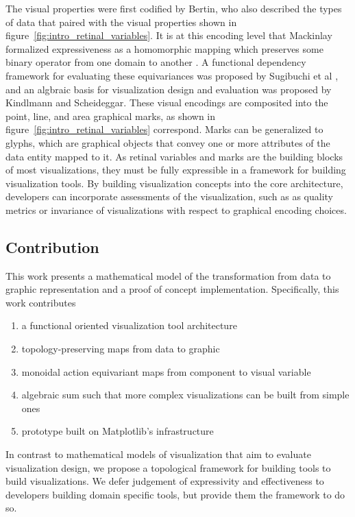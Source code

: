 \documentclass[../main.tex]{subfiles}
\begin{document}
The visual properties were first codified by Bertin\cite{bertinSemiologyGraphicsDiagrams2011a}, who also described the types of data that paired with the visual properties shown in figure~\ref{fig:intro_retinal_variables}. It is at this encoding level that Mackinlay formalized expressiveness as a homomorphic mapping which preserves some binary operator from one domain to another \cite{mackinlayAUTOMATICDESIGNGRAPHICAL1987}. A functional dependency framework for evaluating these equivariances was proposed by Sugibuchi et al \cite{sugibuchiFramwork2009}, and an algbraic basis for visualization design and evaluation was proposed by Kindlmann and Scheideggar\cite{kindlmann2014algebraic}. These visual encodings are composited into the point, line, and area graphical marks, as shown in figure~\ref{fig:intro_retinal_variables} correspond. Marks can be generalized to glyphs, which are graphical objects that convey one or more attributes of the data entity mapped to it\cite{ware2019information, munznerVisualizationAnalysisDesign2014}. As retinal variables and marks are the building blocks of most visualizations, they must be fully expressible in a framework for building visualization tools. By building visualization concepts into the core architecture, developers can incorporate assessments of the visualization,  such as as quality metrics\cite{bertiniQualityMetricsHighdimensional2011a} or invariance \cite{kindlmann2014algebraic} of visualizations with respect to graphical encoding choices.  

\subsection{Contribution}
This work presents a mathematical model of the transformation from data to graphic representation and a proof of concept implementation. Specifically, this work contributes

\begin{enumerate}
    \item a functional oriented visualization tool architecture
    \item topology-preserving maps from data to graphic 
    \item monoidal action equivariant maps from component to visual variable 
    \item algebraic sum such that more complex visualizations can be built from simple ones 
    \item prototype built on Matplotlib's infrastructure
\end{enumerate}
In contrast to mathematical models of visualization that aim to evaluate visualization design, we propose a topological framework for building tools to build visualizations. We defer judgement of expressivity and effectiveness to developers building domain specific tools, but provide them the framework to do so. 
\end{document}
